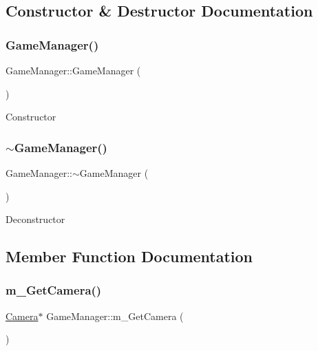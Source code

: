 \subsection{Constructor \& Destructor Documentation}
\mbox{\label{class_game_manager_aa0e2424dc1a39d380e5b6605b179bf05}} 
\subsubsection{\texorpdfstring{Game\+Manager()}{GameManager()}}
{\footnotesize\ttfamily Game\+Manager\+::\+Game\+Manager (\begin{DoxyParamCaption}{ }\end{DoxyParamCaption})\hspace{0.3cm}{\ttfamily [inline]}}

Constructor \mbox{\label{class_game_manager_aaae63e38e358379c1fe507c5197a8435}} 
\subsubsection{\texorpdfstring{$\sim$\+Game\+Manager()}{~GameManager()}}
{\footnotesize\ttfamily Game\+Manager\+::$\sim$\+Game\+Manager (\begin{DoxyParamCaption}{ }\end{DoxyParamCaption})\hspace{0.3cm}{\ttfamily [inline]}}

Deconstructor 

\subsection{Member Function Documentation}
\mbox{\label{class_game_manager_a70317e94178313c28a101430c3aeaa2a}} 
\subsubsection{\texorpdfstring{m\+\_\+\+Get\+Camera()}{m\_GetCamera()}}
{\footnotesize\ttfamily \mbox{\hyperlink{class_camera}{Camera}}$\ast$ Game\+Manager\+::m\+\_\+\+Get\+Camera (\begin{DoxyParamCaption}{ }\end{DoxyParamCaption})\hspace{0.3cm}{\ttfamily [inline]}}

